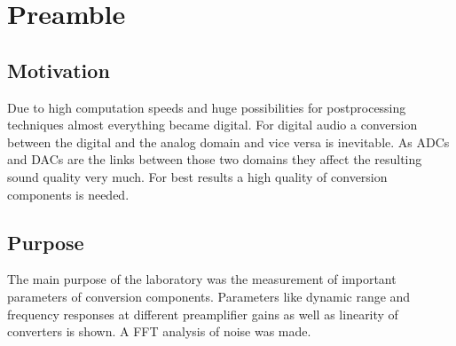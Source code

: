 \documentclass[11pt]{report}
\begin{document}



%

\newpage
\tableofcontents  

%




\listoffigures 


\pagestyle{headings}

\chapter{Preamble}
\label{kap:Einleitung} 

\section{Motivation}
Due to high computation speeds and huge possibilities for postprocessing techniques almost everything became digital. For digital audio a conversion between the digital and the analog domain and vice versa is inevitable. As ADCs and DACs are the links between those two domains they affect the resulting sound quality very much. For best results a high quality of conversion components is needed. 

\section{Purpose}
The main purpose of the laboratory was the measurement of important parameters of conversion components. Parameters like dynamic range and frequency responses at different preamplifier gains as well as linearity of converters is shown. A FFT analysis of noise was made.
\end{document}
